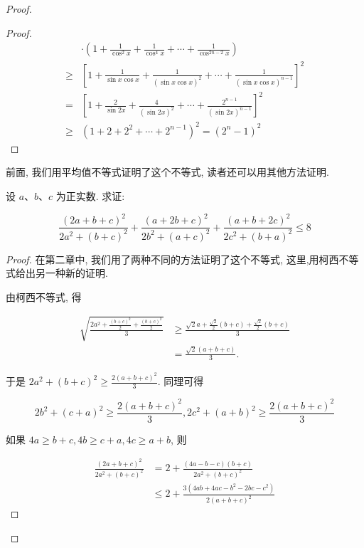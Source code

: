 \begin{proof}
\begin{example}
\begin{proof}
	$$
	\begin{aligned}
	& \cdot\left(1+\frac{1}{\cos ^{2} x}+\frac{1}{\cos ^{4} x}+\cdots+\frac{1}{\cos ^{2 n-2} x}\right) \\
	\geqslant & {\left[1+\frac{1}{\sin x \cos x}+\frac{1}{(\sin x \cos x)^{2}}+\cdots+\frac{1}{(\sin x \cos x)^{n-1}}\right]^{2} } \\
	= & {\left[1+\frac{2}{\sin 2 x}+\frac{4}{(\sin 2 x)^{2}}+\cdots+\frac{2^{n-1}}{(\sin 2 x)^{n-1}}\right]^{2} } \\
	\geqslant & \left(1+2+2^{2}+\cdots+2^{n-1}\right)^{2}=\left(2^{n}-1\right)^{2}
	\end{aligned}
	$$
\end{proof}
\begin{note}
	前面, 我们用平均值不等式证明了这个不等式, 读者还可以用其他方法证明.
\end{note}

\begin{example}
	设 $a 、 b 、 c$ 为正实数. 求证:
	
	$$
	\frac{(2 a+b+c)^{2}}{2 a^{2}+(b+c)^{2}}+\frac{(a+2 b+c)^{2}}{2 b^{2}+(a+c)^{2}}+\frac{(a+b+2 c)^{2}}{2 c^{2}+(b+a)^{2}} \leqslant 8
	$$
\end{example}
\begin{proof}
	在第二章中, 我们用了两种不同的方法证明了这个不等式, 这里,用柯西不等式给出另一种新的证明.
	
	由柯西不等式, 得
	
	$$
	\begin{aligned}
	\sqrt{\frac{2 a^{2}+\frac{(b+c)^{2}}{2}+\frac{(b+c)^{2}}{2}}{3}} & \geqslant \frac{\sqrt{2} a+\frac{\sqrt{2}}{2}(b+c)+\frac{\sqrt{2}}{2}(b+c)}{3} \\
	& =\frac{\sqrt{2}(a+b+c)}{3} .
	\end{aligned}
	$$
	
	于是 $2 a^{2}+(b+c)^{2} \geqslant \frac{2(a+b+c)^{2}}{3}$. 同理可得
	
	$$
	2 b^{2}+(c+a)^{2} \geqslant \frac{2(a+b+c)^{2}}{3}, 2 c^{2}+(a+b)^{2} \geqslant \frac{2(a+b+c)^{2}}{3}
	$$
	
	如果 $4 a \geqslant b+c, 4 b \geqslant c+a, 4 c \geqslant a+b$, 则
	
	$$
	\begin{aligned}
	\frac{(2 a+b+c)^{2}}{2 a^{2}+(b+c)^{2}} & =2+\frac{(4 a-b-c)(b+c)}{2 a^{2}+(b+c)^{2}} \\
	& \leqslant 2+\frac{3\left(4 a b+4 a c-b^{2}-2 b c-c^{2}\right)}{2(a+b+c)^{2}}
	\end{aligned}
	$$
	

\end{proof}
\end{example}
\end{proof}
